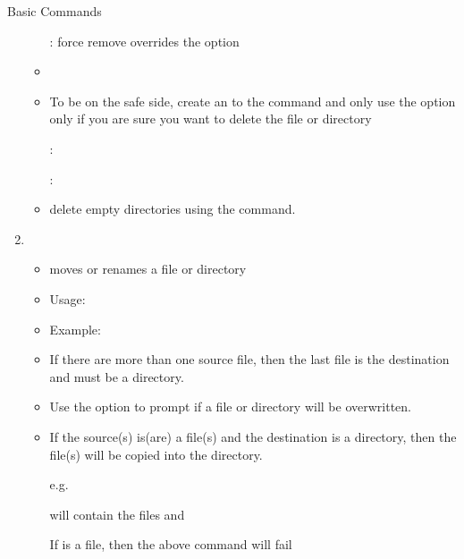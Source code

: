 \documentclass[10pt,t]{beamer}
\begin{document}
\begin{frame}{Basic Commands}
\begin{enumerate}
\begin{itemize}
    \item[] : force remove overrides the  option
    \item {}
    \item To be on the safe side, create an  to the  command and only use the  option only if you are sure you want to delete the file or directory
    \item[] : 
    \item[]    : 
    \item delete empty directories using the  command.
    \end{itemize}
    \framebreak
  \item {} 
    \begin{itemize}
      \item moves or renames a file or directory
      \item Usage: 
      \item Example: 
      \item If there are more than one source file, then the last file is the destination and must be a directory.
      \item Use the  option to prompt if a file or directory will be overwritten.
      \item If the source(s) is(are) a file(s) and the destination is a directory, then the file(s) will be copied into the directory.
      \item[e.g.]
      \item[]  will contain the files  and 
      \item[] If  is a file, then the above command will fail
    \end{itemize}
  \end{enumerate}
\end{frame}
\end{document}
